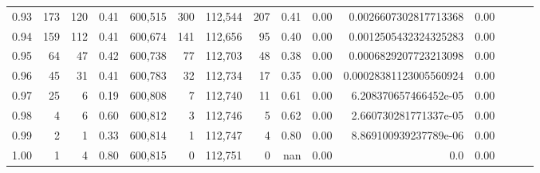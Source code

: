 \begin{tabular}{rrrrrrrrrrrrrrr}
0.93 &     173 &    120 &  0.41 &  600,515 &      300 &  112,544 &      207 &  0.41 &  0.00 &   0.0026607302817713368 &      0.00 \\
0.94 &     159 &    112 &  0.41 &  600,674 &      141 &  112,656 &       95 &  0.40 &  0.00 &   0.0012505432324325283 &      0.00 \\
0.95 &      64 &     47 &  0.42 &  600,738 &       77 &  112,703 &       48 &  0.38 &  0.00 &   0.0006829207723213098 &      0.00 \\
0.96 &      45 &     31 &  0.41 &  600,783 &       32 &  112,734 &       17 &  0.35 &  0.00 &  0.00028381123005560924 &      0.00 \\
0.97 &      25 &      6 &  0.19 &  600,808 &        7 &  112,740 &       11 &  0.61 &  0.00 &   6.208370657466452e-05 &      0.00 \\
0.98 &       4 &      6 &  0.60 &  600,812 &        3 &  112,746 &        5 &  0.62 &  0.00 &   2.660730281771337e-05 &      0.00 \\
0.99 &       2 &      1 &  0.33 &  600,814 &        1 &  112,747 &        4 &  0.80 &  0.00 &   8.869100939237789e-06 &      0.00 \\
1.00 &       1 &      4 &  0.80 &  600,815 &        0 &  112,751 &        0 &   nan &  0.00 &                     0.0 &      0.00 \\
\bottomrule
\end{tabular}
